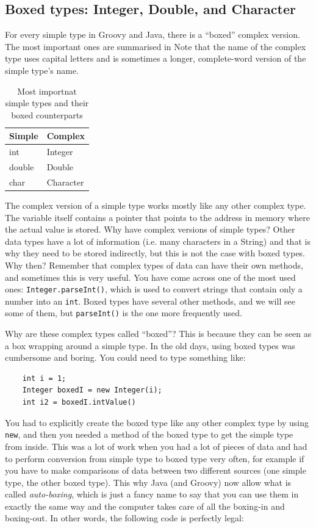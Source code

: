 \subsection{Boxed types: Integer, Double, and Character}
\label{sec:boxed-types:-integer}

For every simple type in Groovy and Java, there is a ``boxed'' complex
version. The most important ones are summarised in 
Note that the name of the complex type uses capital letters and is
sometimes a longer, complete-word version of the simple type's name. 

\begin{table}[htbp]
  \centering
  \begin{tabular}{|l|l|}
    \hline
    Simple & Complex \\
    \hline
    \hline
    int & Integer \\
    double & Double \\
    char & Character \\
    \hline
  \end{tabular}
  \caption{Most importnat simple types and their boxed counterparts}
  \label{tab:jajksdfj}
\end{table}

The complex version of a simple type works mostly like any other
complex type. The variable itself contains a pointer that points to
the address in memory where the actual value is stored. Why have
complex versions of simple types? Other data types have a lot of
information (i.e. many characters in a String) and that is why they
need to be stored indirectly, but this is not the case with boxed
types. Why then? Remember that complex types of data
can have their own methods, and sometimes this is very useful. You
have come across one of the most used ones: \verb+Integer.parseInt()+,
which is used to convert strings that contain only a number into an
\verb+int+. Boxed types have several other methods, and we will see
some of them, but \verb+parseInt()+ is the one more frequently used. 

Why are these complex types called ``boxed''? This is because they can
be seen as a box wrapping around a simple type. In the old days, using
boxed types was cumbersome and boring. You could need to type
something like:

\begin{verbatim}
    int i = 1;
    Integer boxedI = new Integer(i);
    int i2 = boxedI.intValue()
\end{verbatim}

You had to explicitly create the boxed type like any other complex
type by using \verb+new+, and then you needed a method of the boxed
type to get the simple type from inside. This was a lot of work when
you had a lot of pieces of data and had to perform conversion from
simple type to boxed type very often, for example if you have to make
comparisons of data between two different sources (one simple type,
the other boxed type). This why Java (and Groovy) now
allow what is called \emph{auto-boxing}, which is just a fancy name to
say that you can use them in exactly the same way and the computer
takes care of all the boxing-in and boxing-out. In other words, the
following code is perfectly legal: 

